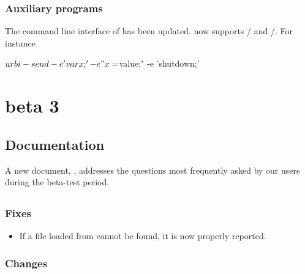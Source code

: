 \subsubsection{Auxiliary programs}
The command line interface of  has been updated.
 now supports / and
/.  For instance

\begin{urbiunchecked}
$ urbi-send -e 'var x;' -e "x = $value;" -e 'shutdown;'
\end{urbiunchecked}



\section{ beta 3}

\subsection{Documentation}

A new document, , addresses the questions most frequently
asked by our users during the beta-test period.

\subsection{\us}

\subsubsection{Fixes}

\begin{itemize}
\item If a file loaded from  cannot be found, it is now
  properly reported.
\end{itemize}


\subsubsection{Changes}

